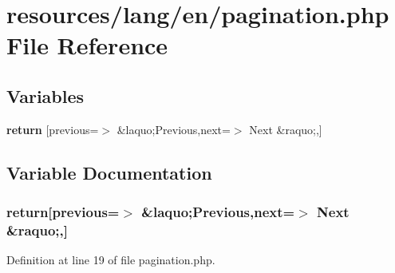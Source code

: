 \section{resources/lang/en/pagination.php File Reference}
\label{pagination_8php}
\subsection*{Variables}
\begin{DoxyCompactItemize}
\item 
{\bf return} [\textquotesingle{}previous\textquotesingle{}=$>$ \textquotesingle{}\&laquo;Previous\textquotesingle{},\textquotesingle{}next\textquotesingle{}=$>$ \textquotesingle{}Next \&raquo;\textquotesingle{},]
\end{DoxyCompactItemize}


\subsection{Variable Documentation}
\subsubsection[{return}]{\setlength{\rightskip}{0pt plus 5cm}return[\textquotesingle{}previous\textquotesingle{}=$>$ \textquotesingle{}\&laquo;Previous\textquotesingle{},\textquotesingle{}next\textquotesingle{}=$>$ \textquotesingle{}Next \&raquo;\textquotesingle{},]}\label{pagination_8php_a61dd15bbb449818ef7e1b51022139918}


Definition at line 19 of file pagination.\+php.

